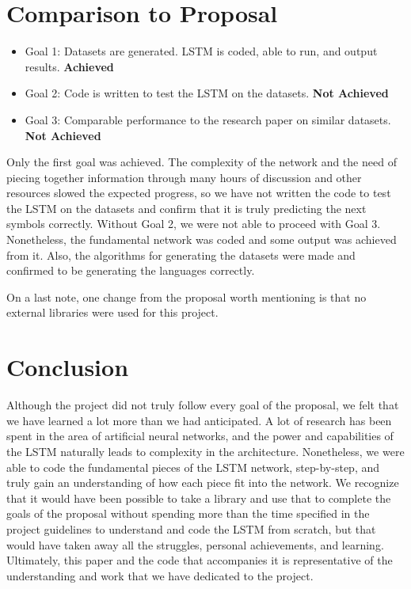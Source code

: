 \documentclass[11pt,letterpaper]{article}
\begin{document}
	\section{Comparison to Proposal}
	\begin{itemize}
		\item Goal 1: Datasets are generated. LSTM is coded, able to run, and output results. \textbf{Achieved}
		\item Goal 2: Code is written to test the LSTM on the datasets. \textbf{Not Achieved}
		\item Goal 3: Comparable performance to the research paper on similar datasets. \textbf{Not Achieved}
	\end{itemize}

	Only the first goal was achieved. The complexity of the network and the need of piecing together information through many hours of discussion and other resources slowed the expected progress, so we have not written the code to test the LSTM on the datasets and confirm that it is truly predicting the next symbols correctly. Without Goal 2, we were not able to proceed with Goal 3. Nonetheless, the fundamental network was coded and some output was achieved from it. Also, the algorithms for generating the datasets were made and confirmed to be generating the languages correctly.

	On a last note, one change from the proposal worth mentioning is that no external libraries were used for this project.

	\section{Conclusion}
	Although the project did not truly follow every goal of the proposal, we felt that we have learned a lot more than we had anticipated. A lot of research has been spent in the area of artificial neural networks, and the power and capabilities of the LSTM naturally leads to complexity in the architecture. Nonetheless, we were able to code the fundamental pieces of the LSTM network, step-by-step, and truly gain an understanding of how each piece fit into the network. We recognize that it would have been possible to take a library and use that to complete the goals of the proposal without spending more than the time specified in the project guidelines to understand and code the LSTM from scratch, but that would have taken away all the struggles, personal achievements, and learning. Ultimately, this paper and the code that accompanies it is representative of the understanding and work that we have dedicated to the project.
\end{document}
